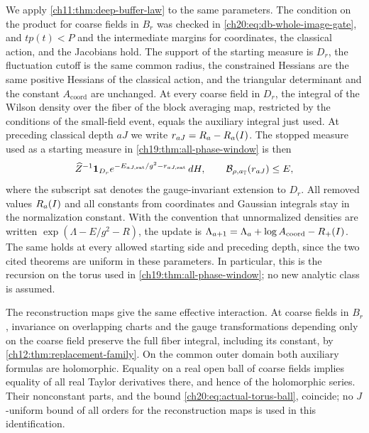 We apply \cref{ch11:thm:deep-buffer-law} to the same parameters. The condition on the product for coarse fields in $B_r$ was checked in \eqref{ch20:eq:db-whole-image-gate}, and $tp(t)<P$ and the intermediate margins for coordinates, the classical action, and the Jacobians hold. The support of the starting measure is $D_r$, the fluctuation cutoff is the same common radius, the constrained Hessians are the same positive Hessians of the classical action, and the triangular determinant and the constant $A_{\mathrm{coord}}$ are unchanged. At every coarse field in $D_r$, the integral of the Wilson density over the fiber of the block averaging map, restricted by the conditions of the small-field event, equals the auxiliary integral just used. At preceding classical depth $aJ$ we write $r_{aJ}=R_a-R_a(I)$. The stopped measure used as a starting measure in \cref{ch19:thm:all-phase-window} is then
\begin{equation}\label{ch20:eq:actual-stopped-input}
 \widehat Z^{-1}\mathbf 1_{D_r}e^{-E_{aJ,\mathrm{sat}}/g^2-r_{aJ,\mathrm{sat}}}\,dH,\qquad \mathcal B_{\rho,a_{\mathbb T}}(r_{aJ})\le E,
\end{equation}
where the subscript $\mathrm{sat}$ denotes the gauge-invariant extension to $D_r$. All removed values $R_a(I)$ and all constants from coordinates and Gaussian integrals stay in the normalization constant. With the convention that unnormalized densities are written $\exp(\Lambda-E/g^2-R)$, the update is $\Lambda_{a+1}=\Lambda_a+\log A_{\mathrm{coord}}-R_+(I)$. The same holds at every allowed starting side and preceding depth, since the two cited theorems are uniform in these parameters. In particular, this is the recursion on the torus used in \cref{ch19:thm:all-phase-window}; no new analytic class is assumed.

The reconstruction maps give the same effective interaction. At coarse fields in $B_r$, invariance on overlapping charts and the gauge transformations depending only on the coarse field preserve the full fiber integral, including its constant, by \cref{ch12:thm:replacement-family}. On the common outer domain both auxiliary formulas are holomorphic. Equality on a real open ball of coarse fields implies equality of all real Taylor derivatives there, and hence of the holomorphic series. Their nonconstant parts, and the bound \eqref{ch20:eq:actual-torus-ball}, coincide; no $J$-uniform bound of all orders for the reconstruction maps is used in this identification.

